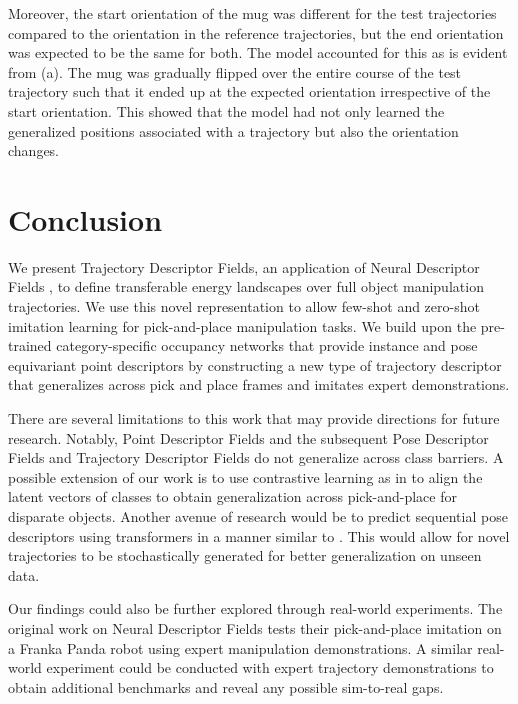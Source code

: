 \documentclass[10pt,twocolumn,letterpaper]{article}
\begin{document}
Moreover, the start orientation of the mug was different for the test trajectories compared to the orientation in the reference trajectories, but the end orientation was expected to be the same for both. The model accounted for this as is evident from (a). The mug was gradually flipped over the entire course of the test trajectory such that it ended up at the expected orientation irrespective of the start orientation. This showed that the model had not only learned the generalized positions associated with a trajectory but also the orientation changes.


\section{Conclusion}

We present Trajectory Descriptor Fields, an application of Neural Descriptor Fields \cite{simeonovdu2021ndf}, to define transferable energy landscapes over full object manipulation trajectories. We use this novel representation to allow few-shot and zero-shot imitation learning for pick-and-place manipulation tasks. We build upon the pre-trained category-specific occupancy networks that provide instance and pose equivariant point descriptors by constructing a new type of trajectory descriptor that generalizes across pick and place frames and imitates expert demonstrations.

There are several limitations to this work that may provide directions for future research. Notably, Point Descriptor Fields and the subsequent Pose Descriptor Fields and Trajectory Descriptor Fields do not generalize across class barriers. A possible extension of our work is to use contrastive learning as in \cite{kipf2019contrastive} \cite{ma2021learning} to align the latent vectors of classes to obtain generalization across pick-and-place for disparate objects. Another avenue of research would be to predict sequential pose descriptors using transformers in a manner similar to \cite{giuliari2020transformer}. This would allow for novel trajectories to be stochastically generated for better generalization on unseen data.

Our findings could also be further explored through real-world experiments. The original work on Neural Descriptor Fields \cite{simeonovdu2021ndf} tests their pick-and-place imitation on a Franka Panda robot using expert manipulation demonstrations. A similar real-world experiment could be conducted with expert trajectory demonstrations to obtain additional benchmarks and reveal any possible sim-to-real gaps.


\newpage

{\small


}
\end{document}
